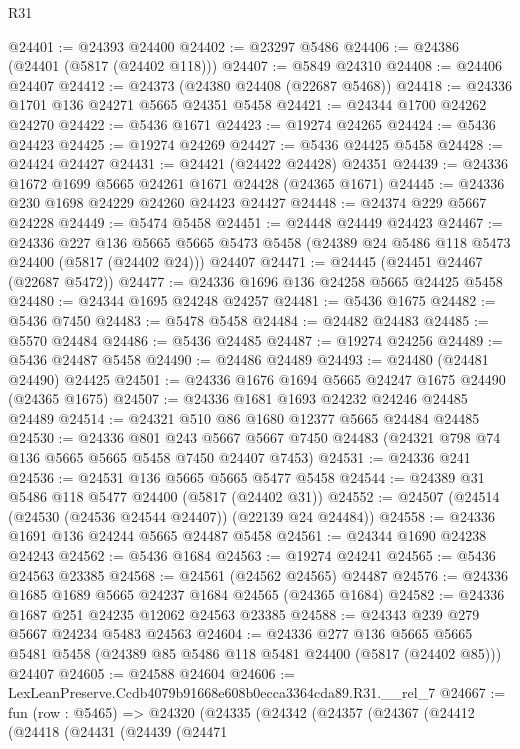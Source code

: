 \begin{lexlean}{R31}
\begin{coremodule}
@24401 := @24393 @24400
@24402 := @23297 @5486
@24406 := @24386 (@24401 (@5817 (@24402 @118)))
@24407 := @5849 @24310
@24408 := @24406 @24407
@24412 := @24373 (@24380 @24408 (@22687 @5468))
@24418 := @24336 @1701 @136 @24271 @5665 @24351 @5458
@24421 := @24344 @1700 @24262 @24270
@24422 := @5436 @1671
@24423 := @19274 @24265
@24424 := @5436 @24423
@24425 := @19274 @24269
@24427 := @5436 @24425 @5458
@24428 := @24424 @24427
@24431 := @24421 (@24422 @24428) @24351
@24439 := @24336 @1672 @1699 @5665 @24261 @1671 @24428 (@24365 @1671)
@24445 := @24336 @230 @1698 @24229 @24260 @24423 @24427
@24448 := @24374 @229 @5667 @24228
@24449 := @5474 @5458
@24451 := @24448 @24449 @24423
@24467 := @24336
    @227
    @136
    @5665
    @5665
    @5473
    @5458
    (@24389 @24 @5486 @118 @5473 @24400 (@5817 (@24402 @24)))
    @24407
@24471 := @24445 (@24451 @24467 (@22687 @5472))
@24477 := @24336 @1696 @136 @24258 @5665 @24425 @5458
@24480 := @24344 @1695 @24248 @24257
@24481 := @5436 @1675
@24482 := @5436 @7450
@24483 := @5478 @5458
@24484 := @24482 @24483
@24485 := @5570 @24484
@24486 := @5436 @24485
@24487 := @19274 @24256
@24489 := @5436 @24487 @5458
@24490 := @24486 @24489
@24493 := @24480 (@24481 @24490) @24425
@24501 := @24336 @1676 @1694 @5665 @24247 @1675 @24490 (@24365 @1675)
@24507 := @24336 @1681 @1693 @24232 @24246 @24485 @24489
@24514 := @24321 @510 @86 @1680 @12377 @5665 @24484 @24485
@24530 := @24336
    @801
    @243
    @5667
    @5667
    @7450
    @24483
    (@24321 @798 @74 @136 @5665 @5665 @5458 @7450 @24407 @7453)
@24531 := @24336 @241
@24536 := @24531 @136 @5665 @5665 @5477 @5458
@24544 := @24389 @31 @5486 @118 @5477 @24400 (@5817 (@24402 @31))
@24552 := @24507 (@24514 (@24530 (@24536 @24544 @24407)) (@22139 @24 @24484))
@24558 := @24336 @1691 @136 @24244 @5665 @24487 @5458
@24561 := @24344 @1690 @24238 @24243
@24562 := @5436 @1684
@24563 := @19274 @24241
@24565 := @5436 @24563 @23385
@24568 := @24561 (@24562 @24565) @24487
@24576 := @24336 @1685 @1689 @5665 @24237 @1684 @24565 (@24365 @1684)
@24582 := @24336 @1687 @251 @24235 @12062 @24563 @23385
@24588 := @24343 @239 @279 @5667 @24234 @5483 @24563
@24604 := @24336
    @277
    @136
    @5665
    @5665
    @5481
    @5458
    (@24389 @85 @5486 @118 @5481 @24400 (@5817 (@24402 @85)))
    @24407
@24605 := @24588 @24604
@24606 := LexLeanPreserve.Ccdb4079b91668e608b0ecca3364cda89.R31.__rel_7
@24667 := fun (row : @5465) =>
  @24320
    (@24335
      (@24342
        (@24357
          (@24367
            (@24412
              (@24418
                (@24431
                  (@24439
                    (@24471

\end{coremodule}
\end{lexlean}
